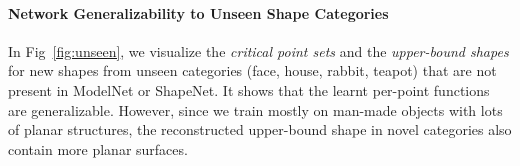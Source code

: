 \paragraph{Network Generalizability to Unseen Shape Categories}
In Fig~\ref{fig:unseen}, we visualize the \textit{critical point sets} and the \textit{upper-bound shapes} for new shapes from unseen categories (face, house, rabbit, teapot) that are not present in ModelNet or ShapeNet. It shows that the learnt per-point functions are generalizable. However, since we train mostly on man-made objects with lots of planar structures, the reconstructed upper-bound shape in novel categories also contain more planar surfaces. 
 
